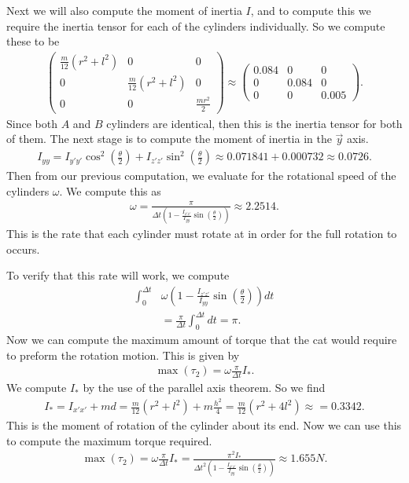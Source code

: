 \documentclass[12]{amsart}
\theoremstyle{definition}
\begin{document}
Next we will also compute the moment of inertia $I$, and to compute this
we require the inertia tensor for each of the cylinders individually. So we
compute these to be
\begin{align*}
   \begin{pmatrix}
     \frac{m}{12}\left(r^2+l^2\right) & 0 & 0\\
     0 & \frac{m}{12}\left(r^2+l^2\right) & 0\\
     0 & 0 & \frac{mr^2}{2}
   \end{pmatrix}\approx
   \begin{pmatrix}
     0.084 & 0 & 0\\
     0 & 0.084 & 0\\
     0 & 0 & 0.005
   \end{pmatrix}.
\end{align*}
Since both $A$ and $B$ cylinders are identical, then this is the inertia tensor
for both of them. The next stage is to compute the moment of inertia in the
$\vec{y}$ axis.
\begin{align*}
   I_{yy}=I_{y'y'}\cos^2\left(\frac{\theta}{2}\right)+I_{z'z'}\sin^2\left(\frac{\theta}{2}\right)\approx0.071841+0.000732\approx0.0726.
\end{align*}
Then from our previous computation, we evaluate for the rotational speed of the
cylinders $\omega$. We compute this as
\begin{align*}
  \omega=\frac{\pi}{\Delta
    t\left(1-\frac{I_{z'z'}}{I_{yy}}\sin\left(\frac{\theta}{2}\right)\right)}\approx2.2514.
\end{align*}
This is the rate that each cylinder must rotate at in order for the full
rotation to occurs.

To verify that this rate will work, we compute
\begin{align*}
  \int_0^{\Delta
    t}&\omega\left(1-\frac{I_{z'z'}}{I_{yy}}\sin\left(\frac{\theta}{2}\right)\right)dt\\
  &=\frac{\pi}{\Delta t}\int_{0}^{\Delta t}dt=\pi.
\end{align*}
Now we can compute the maximum amount of torque that the cat would require to
preform the rotation motion. This is given by
\begin{align*}
  \max(\tau_2)=\omega\frac{\pi}{\Delta t}I_*.
\end{align*}
We compute $I_*$ by the use of the parallel axis theorem. So we find
\begin{align*}
   I_*=I_{x'x'}+md=\frac{m}{12}\left(r^2+l^2\right)+m\frac{h^2}{4}=\frac{m}{12}\left(r^2+4l^2\right)\approx=0.3342.
\end{align*}
This is the moment of rotation of the cylinder about its end. Now we can use
this to compute the maximum torque required.
\begin{align*}
  \max(\tau_2)=\omega\frac{\pi}{\Delta t}I_*=\frac{\pi^2I_*}{\Delta
    t^2\left(1-\frac{I_{z'z'}}{I_{yy}}\sin\left(\frac{\theta}{2}\right)\right)}\approx1.655N.
\end{align*}
\end{document}
